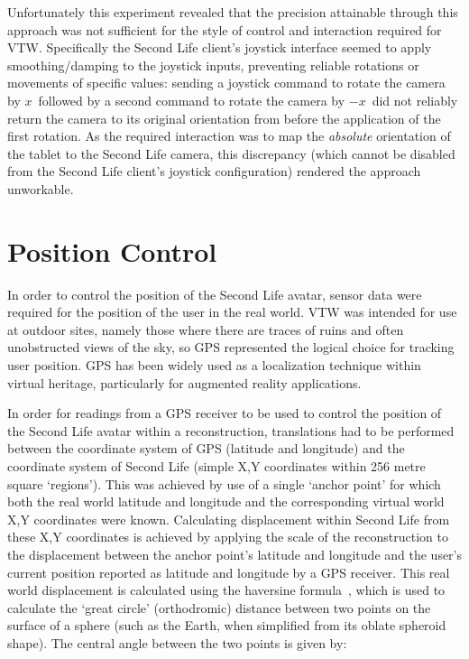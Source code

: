 Unfortunately this experiment revealed that the precision attainable through this approach was not sufficient for the style of control and interaction required for VTW. Specifically the Second Life client's joystick interface seemed to apply smoothing/damping to the joystick inputs, preventing reliable rotations or movements of specific values: sending a joystick command to rotate the camera by $x$\textdegree\ followed by a second command to rotate the camera by $-x$\textdegree\ did not reliably return the camera to its original orientation from before the application of the first rotation. As the required interaction was to map the \textit{absolute} orientation of the tablet to the Second Life camera, this discrepancy (which cannot be disabled from the Second Life client's joystick configuration) rendered the approach unworkable.


\section{Position Control}
\label{second_life_position_control}

In order to control the position of the Second Life avatar, sensor data were required for the position of the user in the real world. VTW was intended for use at outdoor sites, namely those where there are traces of ruins and often unobstructed views of the sky, so GPS represented the logical choice for tracking user position. GPS has been widely used as a localization technique within virtual heritage, particularly for augmented reality applications.


In order for readings from a GPS receiver to be used to control the position of the Second Life avatar within a reconstruction, translations had to be performed between the coordinate system of GPS (latitude and longitude) and the coordinate system of Second Life (simple X,Y coordinates within 256 metre square `regions'). This was achieved by use of a single `anchor point' for which both the real world latitude and longitude and the corresponding virtual world X,Y coordinates were known. Calculating displacement within Second Life from these X,Y coordinates is achieved by applying the scale of the reconstruction to the displacement between the anchor point's latitude and longitude and the user's current position reported as latitude and longitude by a GPS receiver. This real world displacement is calculated using the haversine formula~\cite{VanBrummelen2012}, which is used to calculate the `great circle' (orthodromic) distance between two points on the surface of a sphere (such as the Earth, when simplified from its oblate spheroid shape). The central angle  between the two points is given by:

